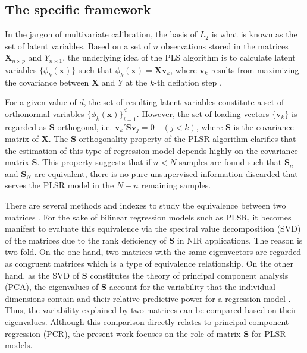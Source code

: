 \documentclass[journal=ancham,manuscript=article]{achemso}
\begin{document}
\subsection{The specific framework}

In the jargon of multivariate calibration, the basis of $L_2$ is what is known as the set of latent variables. Based on a set of $n$ observations stored in the matrices $\mathbf{X}_{n\times p}$ and $Y_{n\times 1}$, the underlying idea of the PLS algorithm is to calculate latent variables $\{\phi_{k}(\mathbf{x})\}$ such that $\phi_k(\mathbf{x}) = \mathbf{Xv}_{k}$, where $\mathbf{v}_k$ results from maximizing the covariance between $\mathbf{X}$ and $Y$ at the $k$-th deflation step \cite{DeJong1993}. 

For a given value of $d$, the set of resulting latent variables constitute a set of orthonormal variables $\{\phi_{k}(\mathbf{x})\}_{i=1}^d$. However, the set of loading vectors $\{\mathbf{v}_k\}$ is regarded as $\mathbf{S}$-orthogonal, i.e. $\mathbf{v}_k'\mathbf{S}\mathbf{v}_j = 0 \quad (j<k)$, where $\mathbf{S}$ is the covariance matrix of $\mathbf{X}$. The $\mathbf{S}$-orthogonality property of the PLSR algorithm clarifies that the estimation of this type of regression model depends highly on the covariance matrix $\mathbf{S}$. This property suggests that if $n<N$ samples are found such that $\mathbf{S}_n$ and $\mathbf{S}_N$ are equivalent, there is no pure unsupervised information discarded that serves the PLSR model in the $N-n$ remaining samples.

There are several methods and indexes to study the equivalence between two matrices \cite{Tomic2013}. For the sake of bilinear regression models such as PLSR, it becomes manifest to evaluate this equivalence via the spectral value decomposition (SVD) of the matrices due to the rank deficiency of $\mathbf{S}$ in NIR applications. The reason is two-fold. On the one hand, two matrices with the same eigenvectors are regarded as congruent matrices which is a type of equivalence relationship\cite{Horn1985}. On the other hand, as the SVD of $\mathbf{S}$ constitutes the theory of principal component analysis (PCA), the eigenvalues of $\mathbf{S}$ account for the variability that the individual dimensions contain and their relative predictive power for a regression model \cite{Artemiou2013}. Thus, the variability explained by two matrices can be compared based on their eigenvalues. Although this comparison directly relates to principal component regression (PCR), the present work focuses on the role of matrix $\mathbf{S}$ for PLSR models.
\end{document}
